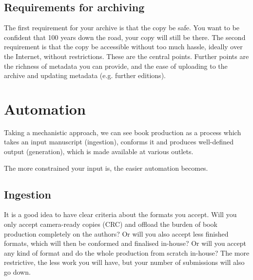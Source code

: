 \documentclass[nonflat,smallfont
]{langsci/langscibook}
\begin{document}
\subsection{Requirements for archiving}
The first requirement for your archive is that the copy be safe. You want to be confident that 100 years down the road, your copy will still be there. The second requirement is that the copy be accessible without too much hassle, ideally over the Internet, without restrictions. These are the central points. Further points are the richness of metadata you can provide, and the ease of uploading to the archive and updating metadata (e.g. further editions).

\section{Automation}\label{sec:automation}
Taking a mechanistic approach, we can see book production as a process which takes an input manuscript (ingestion), conforms it and produces well-defined output (generation), which is   made available at various outlets.
 

The more constrained your input is, the easier automation becomes. 
 
                    
\subsection{Ingestion}
It is a good idea to have clear criteria about the formats you accept. Will you only accept camera-ready copies (CRC) and offload the burden of book production completely on the authors? Or will you also accept less finished formats, which will then be conformed and finalised in-house? Or will you accept any kind of format and do the whole production from scratch in-house? The more restrictive, the less work you will have, but your number of submissions will also go down. 
\end{document}
